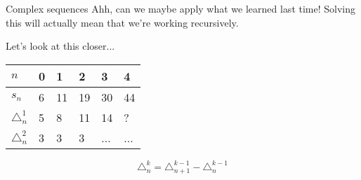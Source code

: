 \begin{intro}{Complex sequences}
        Ahh, can we maybe apply what we learned last time! Solving this will
        actually mean that we're working recursively.

        Let's look at this closer...

        \begin{center}
            \begin{tabular}{l | l l l l l}
                $n$ & 0 & 1 & 2 & 3 & 4
                \\ \hline
                $s_{n}$ & 6 & 11 & 19 & 30 & 44
                \\ \hline
                $\triangle_{n}^{1}$ & 5 & 8 & 11 & 14 & ?
                \\ \hline
                $\triangle_{n}^{2}$ & 3 & 3 & 3 & ... & ...
            \end{tabular}
        \end{center}

        $$\triangle_{n}^{k} = \triangle_{n+1}^{k-1} - \triangle_{n}^{k-1}$$
        
    \end{intro}

    \newpage


